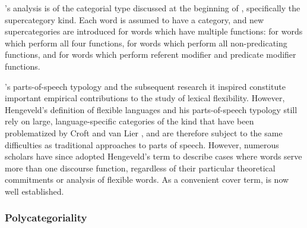 
\citeauthor{Hengeveld1992}'s analysis is of the categorial type discussed at the beginning of , specifically the supercategory kind. Each word is assumed to have a category, and new supercategories are introduced for words which have multiple functions:  for words which perform all four functions,  for words which perform all non-predicating functions, and  for words which perform referent modifier and predicate modifier functions.

\citeauthor{Hengeveld1992}'s parts-of-speech typology and the subsequent research it inspired \parencites{DonLier2003}{HengeveldRijkhoff2005}{Lier2006}{HengeveldLier2010}{Luuk2010}{LierRijkhoff2013}{Lier2016} constitute important empirical contributions to the study of lexical flexibility. However, Hengeveld's definition of flexible languages and his parts-of-speech typology still rely on large, language-specific categories of the kind that have been problematized by Croft  and van Lier \parencite{CroftLier2012}, and are therefore subject to the same difficulties as traditional approaches to parts of speech. However, numerous scholars have since adopted Hengeveld's term  to describe cases where words serve more than one discourse function, regardless of their particular theoretical commitments or analysis of flexible words. As a convenient cover term,  is now well established.

\subsubsection{Polycategoriality}
\label{sec:2.3.1.2}


